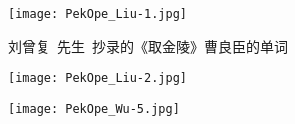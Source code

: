 \newpage
\begin{figure}[h!]
\centering
\vspace{-0.6in}
\texttt{[image: PekOpe\_Liu-1.jpg]}
\caption*{\hei 刘曾复~先生~抄录的《取金陵》曹良臣的单词}
\label{Liu-Script}
\end{figure}
\vspace{30pt}
\begin{figure}[hbtp!]
\hspace*{-0.5in}
\begin{minipage}[t]{0.53\textwidth}
	\centering
	\texttt{[image: PekOpe\_Liu-2.jpg]}
	\caption*{\hei \fontsize{8.5pt}{4.0pt}\selectfont{左:~刘曾复~先生~保存的部分说戏录音磁带}}
\end{minipage}
\hspace{0.6in}
\begin{minipage}[t]{0.43\textwidth}
	\centering
	\vspace{-3.7in}
	\texttt{[image: PekOpe\_Wu-5.jpg]}
	\caption*{\hei \fontsize{8.5pt}{4.0pt}\selectfont{右:吴小如~先生~保存的各类说戏录音磁带}}
\end{minipage}
\label{Records}
\end{figure}


